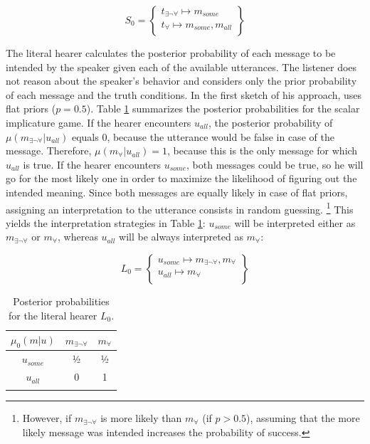 \begin{equation}
S_0 = \begin{Bmatrix} t_{\exists\neg\forall} \mapsto m_{\textit{some}}\\
        t_{\forall} \mapsto m_{\textit{some}}, m_{\textit{all}}\\
       \end{Bmatrix}
\end{equation}

The literal hearer calculates the posterior probability of each message to be intended by the speaker given each of the available utterances. The listener does not reason about the speaker's behavior and considers only the prior probability of each message and the truth conditions. In the first sketch of his approach, \citet{franke2009} uses flat priors ($p = 0.5$). Table \ref{tab:gt-si-l0} summarizes the posterior probabilities for the scalar implicature game. If the hearer encounters $u_{\textit{all}}$, the posterior probability of $\mu(m_{\exists\neg\forall}|u_{\textit{all}})$ equals 0, because the utterance would be false in case of the message. Therefore, $\mu(m_{\forall}|u_{\textit{all}}) = 1$, because this is the only message for which $u_{\textit{all}}$ is true. If the hearer encounters $u_{\textit{some}}$, both messages could be true, so he will go for the most likely one in order to maximize the likelihood of figuring out the intended meaning. Since both messages are equally likely in case of flat priors, assigning an interpretation to the utterance consists in random guessing.%
%
\footnote{However, if $m_{\exists\neg\forall}$ is more likely than $m_{\forall}$ (if $p > 0.5$), assuming that the more likely message was intended increases the probability of success.}\afterfn%
%
This yields the interpretation strategies in Table \ref{tab:gt-si-l0}: $u_{\textit{some}}$ will be interpreted either as $m_{\exists\neg\forall}$ or $m_{\forall}$, whereas $u_{\textit{all}}$ will be always interpreted as $m_{\forall}$:

\begin{equation}\label{eq:l0}
 L_0 = \begin{Bmatrix} u_{\textit{some}} \mapsto m_{\exists\neg\forall},m_{\forall}   \\
        u_{\textit{all}} \mapsto m_{\forall}\\
       \end{Bmatrix}
\end{equation}

\begin{table}
\begin{tabular}{c c c}
 \lsptoprule
 $\mu_0(m|u)$ & $m_{\exists\neg\forall}$ & $m_{\forall}$\\
\midrule
$u_{\textit{some}}$ & ½ & ½ \\
$u_{\textit{all}}$ & 0 & 1\\
\lspbottomrule
\end{tabular}
\caption{Posterior probabilities for the literal hearer $L_0$.\label{tab:gt-si-l0}}
\end{table}

